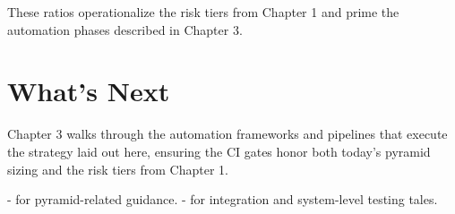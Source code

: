 These ratios operationalize the risk tiers from Chapter 1 and prime the automation phases described in Chapter 3.

\section{What's Next}

Chapter 3 walks through the automation frameworks and pipelines that execute the strategy laid out here, ensuring the CI gates honor both today's pyramid sizing and the risk tiers from Chapter 1.

- \citep{kaner2002testing} for pyramid-related guidance.
- \citep{beizer1995software} for integration and system-level testing tales.
